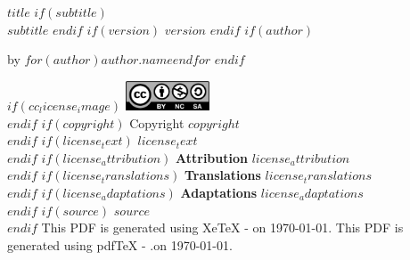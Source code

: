 \documentclass[
    $if(fontsize)$$fontsize$$else$10pt$endif$,
    $if(papersize)$$papersize$$else$letterpaper$endif$,
    titlepage,
    oneside,
    openright,
    $if(draft)$draft$else$final$endif$,
    article]{memoir}
\begin{document}
%
%
\thispagestyle{empty}
\begin{flushleft}
    {\bfseries $title$}
    $if(subtitle)$
        {\\\itshape $subtitle$}
    $endif$
    $if(version)$
        \normalsize {}\space $version$
    $endif$
    \hfill\newline
    $if(author)$

        \normalsize by $for(author)$$author.name$$endfor$
        \vspace*{1em}
    $endif$

    \vspace*{1.5em}

    $if(cc_license_image)$
        \includegraphics[keepaspectratio=true, width=2.5cm]
            {cc_by_nc_sa_40.eps}\\[1.2em]
    $endif$
    \justify
    $if(copyright)$
        \normalsize Copyright \textcopyright\space%
            $copyright$\\[1.2em]
    $endif$
    $if(license_text)$
        \normalsize $license_text$\\[1.2em]
    $endif$
    $if(license_attribution)$
        \normalsize {\bfseries Attribution}\textemdash%
             $license_attribution$\\[1.2em]
    $endif$
    $if(license_translations)$
        \normalsize {\bfseries Translations}\textemdash%
            $license_translations$\\[1.2em]
    $endif$
    $if(license_adaptations)$
        \normalsize {\bfseries Adaptations}\textemdash%
            $license_adaptations$\\[1.2em]
    $endif$
    $if(source)$
        \normalsize $source$\\[1.2em]
    $endif$
    \ifxetex
        \normalsize This PDF is generated using XeTeX %
            \the\eTeXversion\eTeXrevision-%
            \the\XeTeXversion\XeTeXrevision\space on \today.
    \else
        \normalsize This PDF is generated using pdfTeX %
            \the\eTeXversion\eTeXrevision-%
            \the\pdftexversion.\pdftexrevision\space on \today.
    \fi
\end{flushleft}
\pagebreak
\end{document}
